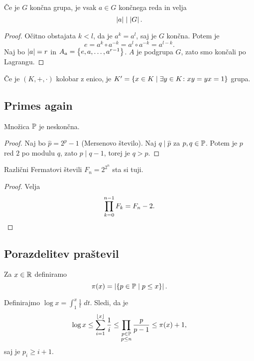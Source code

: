 \documentclass[12pt, a4paper]{article}
\begin{document}
\begin{trditev}
Če je $G$ končna grupa, je vsak $a\in G$ končnega reda in velja
\[
\abs{a}\mid\abs{G}.
\]
\end{trditev}

\begin{proof}
Očitno obstajata $k<l$, da je $a^k=a^l$, saj je $G$ končna. Potem je
\[
e=a^k\circ a^{-k}=a^l\circ a^{-k}=a^{l-k}.
\]
Naj bo $\abs{a}=r$ in $A_a=\set{e,a,\dots,a^{r-1}}$. $A$ je podgrupa $G$, zato smo končali po Lagrangu.
\end{proof}

\begin{trditev}
Če je $(K,+,\cdot)$ kolobar z enico, je $K'=\set{x\in K\mid \exists y\in K\colon xy=yx=1}$ grupa.
\end{trditev}

\obvs

\newpage

\subsection{Primes again}

\begin{izrek}
Množica $\P$ je neskončna.
\end{izrek}

\begin{proof}
Naj bo $\hat{p}=2^p-1$ (Mersenovo število). Naj $q\mid \hat{p}$ za $p,q\in\P$. Potem je $p$ red $2$ po modulu $q$, zato $p\mid q-1$, torej je $q>p$.
\end{proof}

\begin{trditev}
Različni Fermatovi števili $F_n=2^{2^n}$ sta si tuji.
\end{trditev}

\begin{proof}
Velja
\[
\prod_{k=0}^{n-1} F_k=F_n-2.\qedhere
\]
\end{proof}

\newpage

\subsection{Porazdelitev praštevil}

Za $x\in\R$ definiramo
\[
\pi(x)=\abs{\set{p\in\P\mid p\leq x}}.
\]

Definirajmo $\displaystyle\log x=\int_1^x \frac{1}{t}\;dt$. Sledi, da je
\[
\log x\leq \sum_{i=1}^{\floor{x}}\frac{1}{i}\leq\prod_{\substack{p\in\P \\ p\leq n}}\frac{p}{p-1}\leq\pi(x)+1,
\]
saj je $p_i\geq i+1$.
\end{document}
